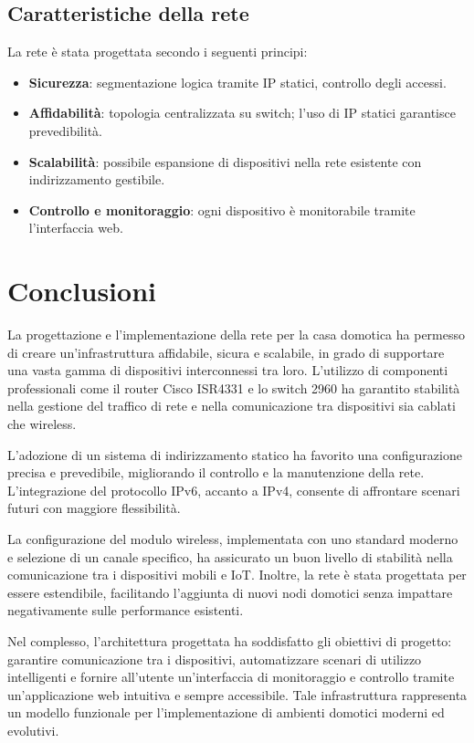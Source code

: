 \documentclass[a4paper,12pt]{article}
\begin{document}
\subsection{Caratteristiche della rete}

La rete è stata progettata secondo i seguenti principi:

\begin{itemize}
    \item \textbf{Sicurezza}: segmentazione logica tramite IP statici, controllo degli accessi.
    \item \textbf{Affidabilità}: topologia centralizzata su switch; l’uso di IP statici garantisce prevedibilità.
    \item \textbf{Scalabilità}: possibile espansione di dispositivi nella rete esistente con indirizzamento gestibile.
    \item \textbf{Controllo e monitoraggio}: ogni dispositivo è monitorabile tramite l’interfaccia web.
\end{itemize}

\section*{Conclusioni}

La progettazione e l’implementazione della rete per la casa domotica ha permesso di creare un’infrastruttura affidabile, sicura e scalabile, in grado di supportare una vasta gamma di dispositivi interconnessi tra loro. L’utilizzo di componenti professionali come il router Cisco ISR4331 e lo switch 2960 ha garantito stabilità nella gestione del traffico di rete e nella comunicazione tra dispositivi sia cablati che wireless.

L’adozione di un sistema di indirizzamento statico ha favorito una configurazione precisa e prevedibile, migliorando il controllo e la manutenzione della rete. L’integrazione del protocollo IPv6, accanto a IPv4, consente di affrontare scenari futuri con maggiore flessibilità.

La configurazione del modulo wireless, implementata con uno standard moderno e selezione di un canale specifico, ha assicurato un buon livello di stabilità nella comunicazione tra i dispositivi mobili e IoT. Inoltre, la rete è stata progettata per essere estendibile, facilitando l’aggiunta di nuovi nodi domotici senza impattare negativamente sulle performance esistenti.

Nel complesso, l’architettura progettata ha soddisfatto gli obiettivi di progetto: garantire comunicazione tra i dispositivi, automatizzare scenari di utilizzo intelligenti e fornire all’utente un’interfaccia di monitoraggio e controllo tramite un’applicazione web intuitiva e sempre accessibile. Tale infrastruttura rappresenta un modello funzionale per l’implementazione di ambienti domotici moderni ed evolutivi.
\end{document}
